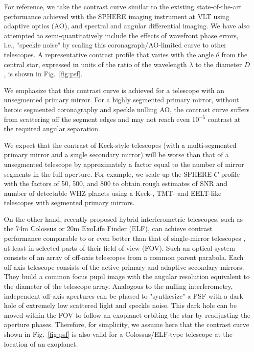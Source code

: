 \documentclass{emulateapj}
\begin{document}
For reference, we take the contrast curve similar to 
the existing state-of-the-art performance achieved with
the SPHERE imaging instrument at VLT \citep{sphere14,sphere17} 
using adaptive optics (AO), and spectral and angular differential imaging. 
We have also attempted to semi-quantitatively 
include the effects of wavefront phase errors, i.e., "speckle noise" \citep{AimeSoummer2004} 
by scaling this coronagraph/AO-limited curve to other telescopes.
A representative contrast profile that varies with the angle $\theta$ from 
the central star, expressed in units of the ratio of the wavelength 
$\lambda$ to the diameter $D$,  is shown in Fig.~\ref{fig:psf}. 

We emphasize that this contrast curve is achieved for a telescope with an unsegmented primary mirror. 
For a highly segmented primary mirror, without heroic segmented coronagraphy and speckle nulling AO, 
the contrast curve suffers from scattering off the segment edges and may not reach even 10$^{-5}$ contrast
at the required angular separation. 

We expect that the contrast of Keck-style telescopes 
(with a multi-segmented primary mirror and a single secondary mirror)
will be worse than that of a unsegmented telescope by approximately a factor equal to 
the number of mirror segments in the full aperture. For example, we scale up 
the SPHERE $C$ profile with the factors of 50, 500, and 800 
to obtain rough estimates of SNR and number of detectable WHZ planets 
using a Keck-, TMT- and EELT-like telescopes with segmented primary mirrors.

On the other hand, recently proposed hybrid interferometric telescopes, 
such as the 74m Colossus or 20m ExoLife Finder (ELF), 
can achieve contrast performance comparable to or even better than that of single-mirror telescopes 
\citep{kuhn2014,moretto2014}, at least in selected parts of their field of view (FOV).
Such an optical system consists of an array of off-axis telescopes from a common
parent parabola. Each off-axis telescope consists of the active primary and adaptive secondary mirrors.
They build a common focus pupil image with the angular resolution equivalent to the diameter 
of the telescope array. 
Analogous to the nulling interferometry, independent off-axis apertures can be phased 
to "synthesize" a PSF with a dark hole of extremely low scattered light and speckle noise. 
This dark hole can be moved within the FOV to follow an exoplanet orbiting the star 
by readjusting the aperture phases.
Therefore, for simplicity, we assume here that the contrast curve shown in Fig.~\ref{fig:psf} 
is also valid for a Colossus/ELF-type telescope at the location of an exoplanet. 
\end{document}
